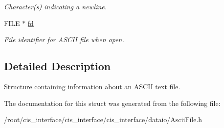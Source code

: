 \begin{DoxyCompactItemize}
\begin{DoxyCompactList}\small\item\em Character(s) indicating a newline. \end{DoxyCompactList}\item 
\mbox{\label{structasciiFile__t_a799e768ea6b00c3cdf49303950b015b6}} 
F\+I\+LE $\ast$ \mbox{\hyperlink{structasciiFile__t_a799e768ea6b00c3cdf49303950b015b6}{fd}}
\begin{DoxyCompactList}\small\item\em File identifier for A\+S\+C\+II file when open. \end{DoxyCompactList}\end{DoxyCompactItemize}


\subsection{Detailed Description}
Structure containing information about an A\+S\+C\+II text file. 

The documentation for this struct was generated from the following file\+:\begin{DoxyCompactItemize}
\item 
/root/cis\+\_\+interface/cis\+\_\+interface/cis\+\_\+interface/dataio/Ascii\+File.\+h\end{DoxyCompactItemize}
